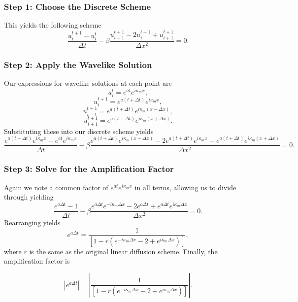 \subsubsection{Step 1: Choose the Discrete Scheme}
This yields the following scheme
\begin{equation}
  \frac{u_i^{t+1} - u_{i}^t}{\Delta t} - \beta \frac{u_{i-1}^{t+1} - 2u_i^{t+1} + u_{i+1}^{t+1}}{\Delta x^2} = 0.
\end{equation}

\subsubsection{Step 2: Apply the Wavelike Solution}
Our expressions for wavelike solutions at each point are
\begin{equation}
	u_{i}^t = e^{at} e^{i \kappa_m x},
\end{equation}
\begin{equation}
	u_{i}^{t+1} = e^{a(t + \Delta t)} e^{i \kappa_m x},
\end{equation}
\begin{equation}
	u_{i-1}^{t+1} = e^{a(t + \Delta t)} e^{i \kappa_m (x - \Delta x)},
\end{equation}
\begin{equation}
	u_{i+1}^{t+1} = e^{a(t + \Delta t)} e^{i \kappa_m (x + \Delta x)}.
\end{equation}
Substituting these into our discrete scheme yields
\begin{equation}
  \frac{e^{a(t + \Delta t)} e^{i \kappa_m x} - e^{at} e^{i \kappa_m x}}{\Delta t} - \beta \frac{e^{a(t + \Delta t)} e^{i \kappa_m (x - \Delta x)} - 2e^{a(t + \Delta t)} e^{i \kappa_m x} + e^{a(t + \Delta t)} e^{i \kappa_m (x + \Delta x)}}{\Delta x^2} = 0.
\end{equation}

\subsubsection{Step 3: Solve for the Amplification Factor}
Again we note a common factor of $e^{at} e^{i \kappa_m x}$ in all terms, allowing us to divide through yielding
\begin{equation}
  \frac{e^{a\Delta t} - 1}{\Delta t} - \beta \frac{e^{a\Delta t} e^{-i \kappa_m \Delta x} - 2e^{a\Delta t} + e^{a\Delta t} e^{i \kappa_m \Delta x}}{\Delta x^2} = 0.
\end{equation}
Rearranging yields
\begin{equation}
e^{a\Delta t}	= \frac{1}{\left[ 1 - r \left(e^{-i \kappa_m \Delta x} - 2 + e^{i \kappa_m \Delta x} \right)  \right]},
\end{equation}
where $r$ is the same as the original linear diffusion scheme. Finally, the amplification factor is
\begin{eqBox}
\begin{equation}
	|e^{a\Delta t}|	= \left| \frac{1}{\left[ 1 - r \left(e^{-i \kappa_m \Delta x} - 2 + e^{i \kappa_m \Delta x} \right)  \right]} \right|.
\end{equation}
\end{eqBox}

